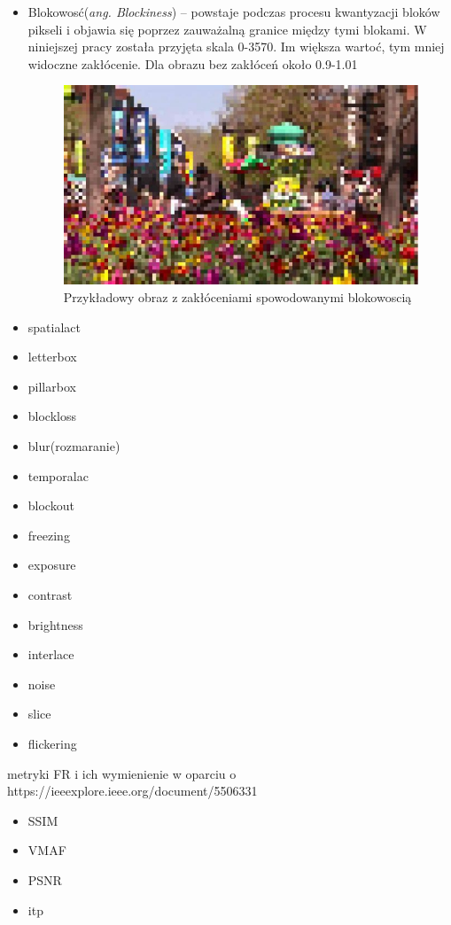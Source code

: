\begin{itemize}[label=$\bullet$]
\item Blokowosć({\em ang. Blockiness}) -- powstaje podczas procesu kwantyzacji bloków pikseli i objawia się poprzez zauważalną granice między tymi blokami\cite{blockiness}. W niniejszej pracy została przyjęta skala 0-3570. Im większa wartoć, tym mniej widoczne zakłócenie. Dla obrazu bez zakłóceń około 0.9-1.01\cite{agh_vqm}
\begin{figure}[h]
\centerline{\includegraphics[scale=0.5]{blockiness}}
\caption{Przykładowy obraz z zakłóceniami spowodowanymi blokowoscią\cite{agh_vqm}}
\label{fig:xccs}
\end{figure}

\item spatialact
\item letterbox 
\item pillarbox 
\item blockloss 
\item blur(rozmaranie) 
\item temporalac
\item blockout 
\item freezing 
\item exposure 
\item contrast 
\item brightness
\item interlace 
\item noise 
\item slice 
\item flickering
\end{itemize}

metryki FR i ich wymienienie w oparciu o https://ieeexplore.ieee.org/document/5506331

\begin{itemize}[label=$\bullet$]
\item SSIM
\item VMAF
\item PSNR
\item itp
\end{itemize}

